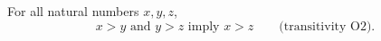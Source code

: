 For all natural numbers $x, y, z$,
$$x > y \text{ and } y > z \text{ imply } x > z \qquad \text{(transitivity O2)}.$$
